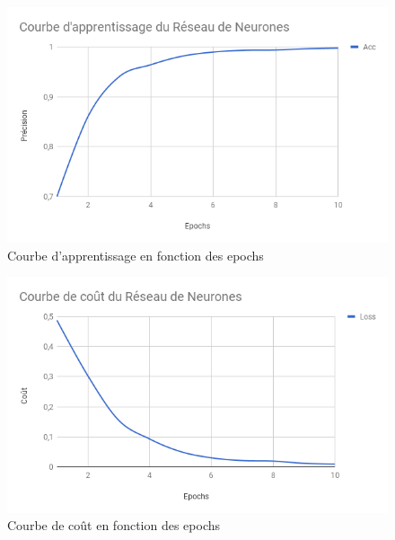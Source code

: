 \begin{figure}
	\centering
	\includegraphics[scale=0.75]{./img/learn_nn_chart.png}
	\caption{Courbe d'apprentissage en fonction des epochs}
	\label{fig:nn_app}
\end{figure}

\par %

\begin{figure}
	\centering
	\includegraphics[scale=0.75]{./img/loss_nn_chart.png}
	\caption{Courbe de coût en fonction des epochs}
	\label{fig:nn_loss}
\end{figure}

\par %

\par %


